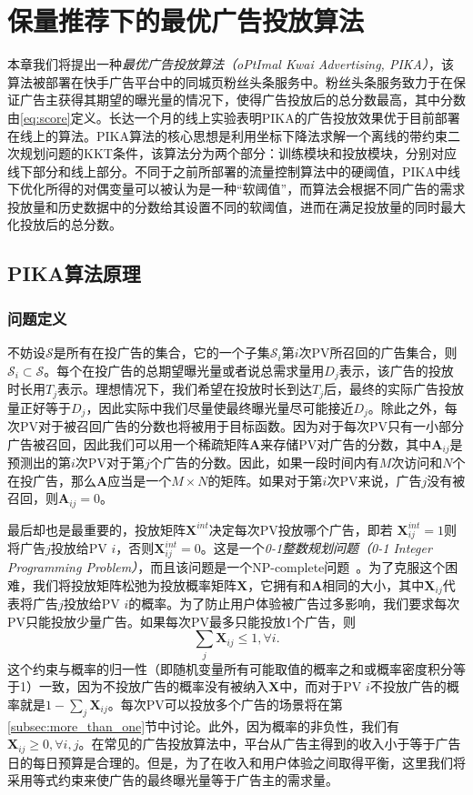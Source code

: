 \chapter{保量推荐下的最优广告投放算法}
\label{cha:allocation}

本章我们将提出一种\textit{最优广告投放算法（oPtImal Kwai Advertising, PIKA）}，该算法被部署在快手广告平台中的同城页粉丝头条服务中。粉丝头条服务致力于在保证广告主获得其期望的曝光量的情况下，使得广告投放后的总分数最高，其中分数由\ref{eq:score}定义。长达一个月的线上实验表明PIKA的广告投放效果优于目前部署在线上的算法。PIKA算法的核心思想是利用坐标下降法求解一个离线的带约束二次规划问题的KKT条件，该算法分为两个部分：训练模块和投放模块，分别对应线下部分和线上部分。不同于之前所部署的流量控制算法中的硬阈值，PIKA中线下优化所得的对偶变量可以被认为是一种“软阈值”，而算法会根据不同广告的需求投放量和历史数据中的分数给其设置不同的软阈值，进而在满足投放量的同时最大化投放后的总分数。

\section{PIKA算法原理}

\subsection{问题定义}

不妨设$\mathcal{S}$是所有在投广告的集合，它的一个子集$\mathcal{S}_i$第$i$次PV所召回的广告集合，则$\mathcal{S}_i \subset \mathcal{S}$。每个在投广告的总期望曝光量或者说总需求量用$D_j$表示，该广告的投放时长用$T_j$表示。理想情况下，我们希望在投放时长到达$T_j$后，最终的实际广告投放量正好等于$D_j$，因此实际中我们尽量使最终曝光量尽可能接近$D_j$。除此之外，每次PV对于被召回广告的分数也将被用于目标函数。因为对于每次PV只有一小部分广告被召回，因此我们可以用一个稀疏矩阵$\bm{A}$来存储PV对广告的分数，其中$\bm{A}_{ij}$是预测出的第$i$次PV对于第$j$个广告的分数。因此，如果一段时间内有$M$次访问和$N$个在投广告，那么$\bm{A}$应当是一个$M \times N$的矩阵。如果对于第$i$次PV来说，广告$j$没有被召回，则$\bm{A}_{ij}=0$。

最后却也是最重要的，投放矩阵$\bm{X}^{int}$决定每次PV投放哪个广告，即若 $\bm{X}^{int}_{ij} = 1$则将广告$j$投放给PV $i$，否则$\bm{X}^{int}_{ij} = 0$。这是一个\textit{0-1整数规划问题（0-1 Integer Programming Problem）}，而且该问题是一个NP-complete问题~\cite{garey2002computers}。为了克服这个困难，我们将投放矩阵松弛为投放概率矩阵$\bm{X}$，它拥有和$\bm{A}$相同的大小，其中$\bm{X}_{ij}$代表将广告$j$投放给PV $i$的概率。为了防止用户体验被广告过多影响，我们要求每次PV只能投放少量广告。如果每次PV最多只能投放1个广告，则
\begin{equation}
\sum_j \bm{X}_{ij} \le 1, \forall i.
\end{equation}
这个约束与概率的归一性（即随机变量所有可能取值的概率之和或概率密度积分等于1）一致，因为不投放广告的概率没有被纳入$\bm{X}$中，而对于PV $i$不投放广告的概率就是$1-\sum_j \bm{X}_{ij}$。每次PV可以投放多个广告的场景将在第\ref{subsec:more_than_one}节中讨论。此外，因为概率的非负性，我们有$\bm{X}_{ij} \ge 0, \forall i,j$。在常见的广告投放算法中，平台从广告主得到的收入小于等于广告日的每日预算是合理的。但是，为了在收入和用户体验之间取得平衡，这里我们将采用等式约束来使广告的最终曝光量等于广告主的需求量。

